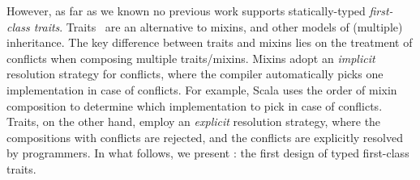 However, as far as we known no previous work supports statically-typed
\emph{first-class traits}. Traits~\citep{scharli2003traits, Ducasse_2006} are an
alternative to mixins, and other models of (multiple) inheritance. The key
difference between traits and mixins lies on the treatment of conflicts when
composing multiple traits/mixins. Mixins adopt an \emph{implicit} resolution
strategy for conflicts, where the compiler automatically picks one
implementation in case of conflicts. For example, Scala uses the order of mixin
composition to determine which implementation to pick in case of conflicts.
Traits, on the other hand, employ an \emph{explicit} resolution strategy, where
the compositions with conflicts are rejected, and the conflicts are explicitly
resolved by programmers. In what follows, we present \sedel: the first design of
typed first-class traits.






% 
% 


